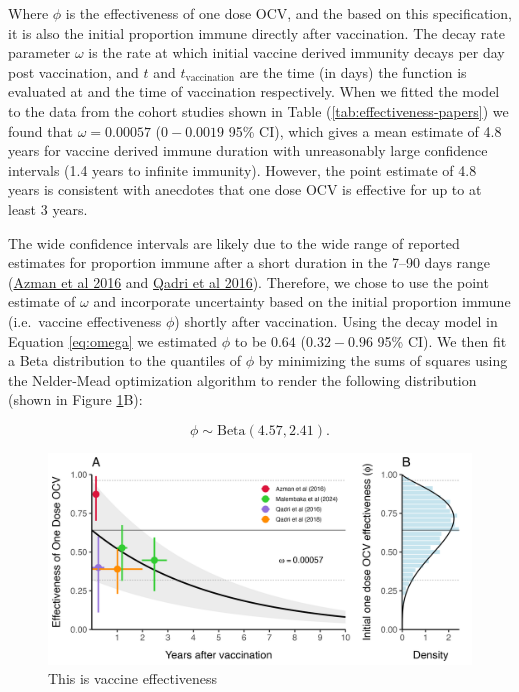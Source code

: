 \documentclass[
]{book}
\begin{document}
Where \(\phi\) is the effectiveness of one dose OCV, and the based on this specification, it is also the initial proportion immune directly after vaccination. The decay rate parameter \(\omega\) is the rate at which initial vaccine derived immunity decays per day post vaccination, and \(t\) and \(t_{\text{vaccination}}\) are the time (in days) the function is evaluated at and the time of vaccination respectively. When we fitted the model to the data from the cohort studies shown in Table (\ref{tab:effectiveness-papers}) we found that \(\omega = 0.00057\) (\(0-0.0019\) 95\% CI), which gives a mean estimate of 4.8 years for vaccine derived immune duration with unreasonably large confidence intervals (1.4 years to infinite immunity). However, the point estimate of 4.8 years is consistent with anecdotes that one dose OCV is effective for up to at least 3 years.

The wide confidence intervals are likely due to the wide range of reported estimates for proportion immune after a short duration in the 7--90 days range (\href{https://www.thelancet.com/journals/langlo/article/PIIS2214-109X(16)30211-X/fulltext}{Azman et al 2016} and \href{https://www.nejm.org/doi/full/10.1056/NEJMoa1510330}{Qadri et al 2016}). Therefore, we chose to use the point estimate of \(\omega\) and incorporate uncertainty based on the initial proportion immune (i.e.~vaccine effectiveness \(\phi\)) shortly after vaccination. Using the decay model in Equation \eqref{eq:omega} we estimated \(\phi\) to be \(0.64\) (\(0.32-0.96\) 95\% CI). We then fit a Beta distribution to the quantiles of \(\phi\) by minimizing the sums of squares using the Nelder-Mead optimization algorithm to render the following distribution (shown in Figure \ref{fig:effectiveness}B):

\begin{equation} 
\phi \sim \text{Beta}(4.57, 2.41).
\label{eq:effectiveness}
\end{equation}

\begin{figure}

{\centering \includegraphics[width=1.02\linewidth]{figures/vaccine_effectiveness} 

}

\caption{This is vaccine effectiveness}\label{fig:effectiveness}
\end{figure}
\end{document}
